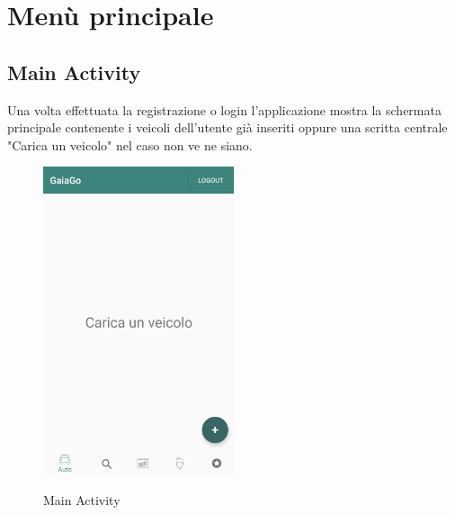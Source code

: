 \section{Menù principale}
\subsection{Main Activity}
Una volta effettuata la registrazione o login l'applicazione mostra la schermata principale contenente i veicoli dell'utente già inseriti oppure una scritta centrale "Carica un veicolo" nel caso non ve ne siano.
 \begin{figure}[H] 
	\centering 
	\includegraphics[width=0.5\textwidth]{res/images/main_activity_vuota.png}\\
	\caption{Main Activity}
	\label{Login}
\end{figure}
\pagebreak
